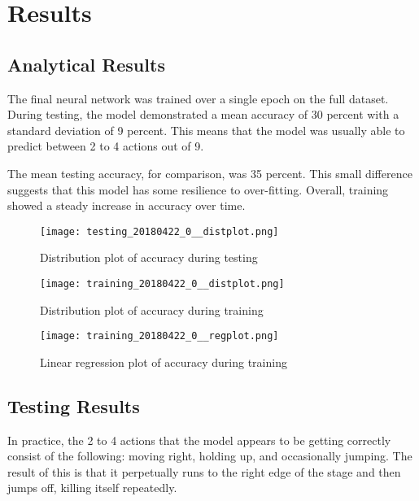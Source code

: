 \chapter{Results}



\section{Analytical Results}

The final neural network was trained over a single epoch on the full dataset. During testing, the model demonstrated a mean accuracy of 30 percent with a standard deviation of 9 percent. This means that the model was usually able to predict between 2 to 4 actions out of 9.

The mean testing accuracy, for comparison, was 35 percent. This small difference suggests that this model has some resilience to over-fitting. Overall, training showed a steady increase in accuracy over time.

\begin{figure}
    \caption{Distribution plot of accuracy during testing \cite{SciPy}}
    \centering
    \texttt{[image: testing\_20180422\_0\_\_distplot.png]} \\
\end{figure}

\begin{figure}
    \caption{Distribution plot of accuracy during training \cite{SciPy}}
    \centering
    \texttt{[image: training\_20180422\_0\_\_distplot.png]} \\
\end{figure}

\begin{figure}
    \caption{Linear regression plot of accuracy during training \cite{SciPy}}
    \centering
    \texttt{[image: training\_20180422\_0\_\_regplot.png]} \\
\end{figure}






\section{Testing Results}

In practice, the 2 to 4 actions that the model appears to be getting correctly consist of the following: moving right, holding up, and occasionally jumping. The result of this is that it perpetually runs to the right edge of the stage and then jumps off, killing itself repeatedly.

